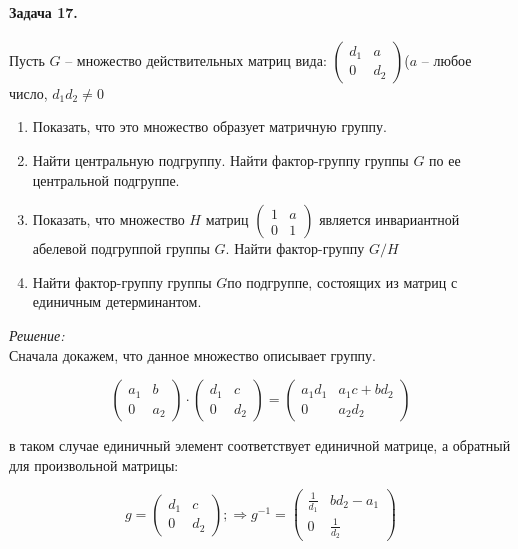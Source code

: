 \documentclass[10pt,a4paper]{article}
\begin{document}
 	\paragraph{Задача 17.} Пусть $G$ --  множество действительных матриц вида:
 	$\begin{pmatrix}
 		d_{1} & a\\
 		0 & d_{2}
 	\end{pmatrix}$($a$ -- любое число, $d_{1}d_{2} \neq 0$
 	
 	\begin{enumerate}
 		\item Показать, что это множество образует матричную группу.
  		\item Найти центральную подгруппу. Найти фактор-группу группы $G$ по 
  		ее центральной подгруппе.
 		\item Показать, что множество $H$ матриц $\begin{pmatrix}
 			1 & a\\
 			0 & 1
 		\end{pmatrix}$ является инвариантной абелевой подгруппой группы $G$.
 		Найти фактор-группу $G/H$
 		\item Найти фактор-группу группы $G$по подгруппе, состоящих из матриц с 	
 		единичным детерминантом.
 	\end{enumerate}
 	
 	\textit{Решение:}\\
 	
 	Сначала докажем, что данное множество описывает группу.
 	
 	\begin{equation}
 		\label{eq:ex_17_eq_01}
 		\begin{pmatrix}
 			a_{1} & b\\
 			0 & a_{2}
 		\end{pmatrix}\cdot
 		\begin{pmatrix}
 			d_{1} & c\\
 			0 & d_{2}
 		\end{pmatrix} = 
 		\begin{pmatrix}
 			a_{1}d_{1} & a_{1}c + bd_{2}\\
 			0 & a_{2}d_{2}
 		\end{pmatrix}
 	\end{equation}
 	
 	в таком случае единичный элемент соответствует единичной матрице, а 
 	обратный для произвольной матрицы:
 	
 	\begin{equation}
 		g = 
 		\begin{pmatrix}
 			d_{1} & c\\
 			0 & d_{2}
 		\end{pmatrix}; \Rightarrow 
 		g^{-1} = 
 		\begin{pmatrix}
 			\frac{1}{d_{1}} & bd_{2} - a_{1}\\
 			0 & \frac{1}{d_{2}}
 		\end{pmatrix}
 	\end{equation}
 	
\end{document}
